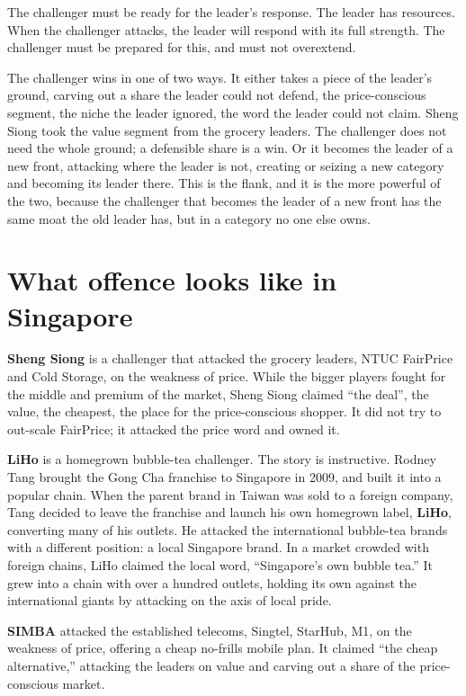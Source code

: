 \documentclass[10pt,twoside,openany]{memoir}
\newcommand{\needspacehead}{\needspace{4\baselineskip}}
\let\oldsection\section
\renewcommand{\section}{\needspacehead\oldsection}
\begin{document}
{The challenger must be ready for the leader's response. The leader has
resources. When the challenger attacks, the leader will respond with its
full strength. The challenger must be prepared for this, and must not
overextend.

The challenger wins in one of two ways. It either takes a piece of the
leader's ground, carving out a share the leader could not defend, the
price-conscious segment, the niche the leader ignored, the word the
leader could not claim. Sheng Siong took the value segment from the
grocery leaders. The challenger does not need the whole ground; a
defensible share is a win. Or it becomes the leader of a new front,
attacking where the leader is not, creating or seizing a new category
and becoming its leader there. This is the flank, and it is the more
powerful of the two, because the challenger that becomes the leader of a
new front has the same moat the old leader has, but in a category no one
else owns.

\section{What offence looks like in
Singapore}\label{what-offence-looks-like-in-singapore}

\textbf{Sheng Siong} is a challenger that attacked the grocery leaders,
NTUC FairPrice and Cold Storage, on the weakness of price. While the
bigger players fought for the middle and premium of the market, Sheng
Siong claimed ``the deal'', the value, the cheapest, the place for the
price-conscious shopper. It did not try to out-scale FairPrice; it
attacked the price word and owned it.

\textbf{LiHo} is a homegrown bubble-tea challenger. The story is
instructive. Rodney Tang brought the Gong Cha franchise to Singapore in
2009, and built it into a popular chain. When the parent brand in Taiwan
was sold to a foreign company, Tang decided to leave the franchise and
launch his own homegrown label, \textbf{LiHo}, converting many of his
outlets. He attacked the international bubble-tea brands with a
different position: a local Singapore brand. In a market crowded with
foreign chains, LiHo claimed the local word, ``Singapore's own bubble
tea.'' It grew into a chain with over a hundred outlets, holding its own
against the international giants by attacking on the axis of local
pride.

\textbf{SIMBA} attacked the established telecoms, Singtel, StarHub, M1,
on the weakness of price, offering a cheap no-frills mobile plan. It
claimed ``the cheap alternative,'' attacking the leaders on value and
carving out a share of the price-conscious market.

}
\end{document}

